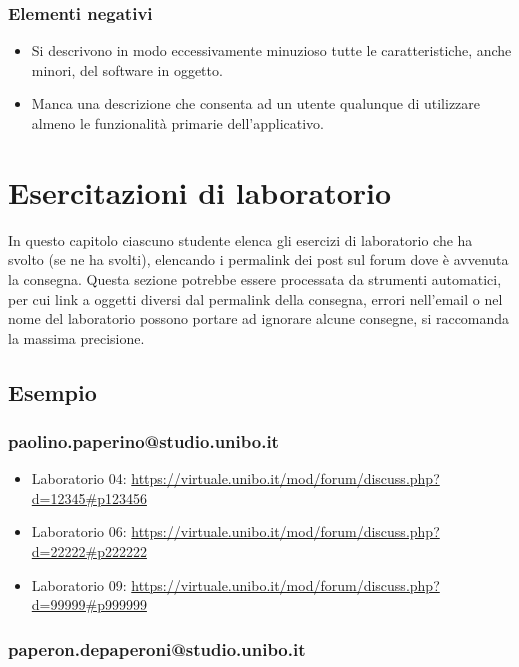 \documentclass[a4paper,12pt]{report}
\begin{document}
\subsection*{Elementi negativi}
\begin{itemize}
 \item Si descrivono in modo eccessivamente minuzioso tutte le caratteristiche, anche minori, del software in oggetto.
 \item Manca una descrizione che consenta ad un utente qualunque di utilizzare almeno le funzionalità primarie dell'applicativo.
\end{itemize}

\chapter{Esercitazioni di laboratorio}

In questo capitolo ciascuno studente elenca gli esercizi di laboratorio che ha svolto
(se ne ha svolti),
elencando i permalink dei post sul forum dove è avvenuta la consegna.
%
Questa sezione potrebbe essere processata da strumenti automatici,
per cui link a oggetti diversi dal permalink della consegna,
errori nell'email o nel nome del laboratorio possono portare ad ignorare alcune consegne,
si raccomanda la massima precisione.

\section*{Esempio}

\subsection{paolino.paperino@studio.unibo.it}

\begin{itemize}
 \item Laboratorio 04: \url{https://virtuale.unibo.it/mod/forum/discuss.php?d=12345#p123456}
 \item Laboratorio 06: \url{https://virtuale.unibo.it/mod/forum/discuss.php?d=22222#p222222}
 \item Laboratorio 09: \url{https://virtuale.unibo.it/mod/forum/discuss.php?d=99999#p999999}
\end{itemize}

\subsection{paperon.depaperoni@studio.unibo.it}
\end{document}
